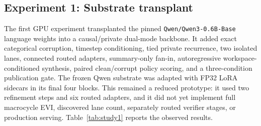 \documentclass[10pt,a4paper]{article}
\begin{document}
\subsection{Experiment 1: Substrate transplant}

The first GPU experiment transplanted the pinned \texttt{Qwen/Qwen3-0.6B-Base}
language weights into a causal/private dual-mode backbone. It added exact
categorical corruption, timestep conditioning, tied private recurrence, two
isolated lanes, connected routed adapters, summary-only fan-in,
autoregressive workspace-conditioned synthesis, paired clean/corrupt policy
scoring, and a three-condition publication gate. The frozen Qwen substrate was
adapted with FP32 LoRA sidecars in its final four blocks. This remained a
reduced prototype: it used two refinement steps and six routed adapters, and
it did not yet implement full macrocycle EVI, discovered lane count,
separately routed verifier stages, or production serving.
Table~\ref{tab:study1} reports the observed results.
\end{document}
